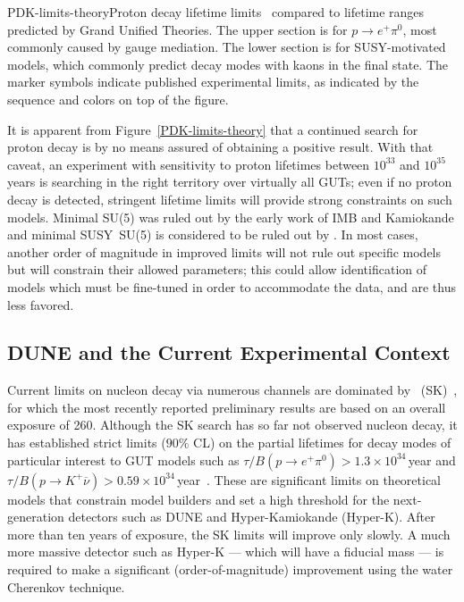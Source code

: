 \begin{cdrfigure}{PDK-limits-theory}{Proton decay lifetime
limits~\cite{Beringer:1900zz,Nishino:2012ipa} compared to lifetime ranges
  predicted by Grand Unified Theories. The upper section is for
  $p \rightarrow e^+ \pi^0$, most commonly caused by gauge mediation.
  The lower section is for SUSY-motivated models, which commonly
  predict decay modes with kaons in the final state. The
  marker symbols indicate published experimental limits, as indicated
  by the sequence and colors on top of the figure.}
\end{cdrfigure}


It is apparent from Figure~\ref{PDK-limits-theory} that a continued
search for proton decay is by no means assured of obtaining a positive
result.  With that caveat, an experiment with sensitivity to proton lifetimes
between $10^{33}$ and $10^{35}$ years is searching in the right territory over
virtually all GUTs; even if no proton decay is detected,
stringent lifetime limits will provide strong constraints on such
models.  Minimal SU(5) was ruled out by the early work of IMB and
Kamiokande and minimal SUSY~SU(5) is considered to be ruled out by \superk.
In most cases, another order of magnitude in improved limits will not rule out
specific models but will constrain their allowed parameters;
this could allow identification of models which must be fine-tuned
in order to accommodate the data, and are thus less favored.

\subsection{DUNE and the Current Experimental Context}

Current limits on nucleon decay via numerous channels are dominated by
\superk\ (SK)~\cite{Raaf:2012pva}, for which the most recently
reported preliminary results are based on an overall exposure of
\SI{260}{\ktyr}.
%
Although the SK search has so far not observed nucleon decay, it
has established strict limits ($90\%$ CL) on the partial lifetimes for
decay modes of particular interest to GUT models such as $\tau/B(p\to
e^+\pi^0) > 1.3\times 10^{\mathrm{34}}\,$year and $\tau/B(p\to
K^+\overline{\nu}) > 0.59\times
10^{\mathrm{34}}\,$year~\cite{kearns_isoups}.  These are significant
limits on theoretical models that constrain model builders and set a
high threshold for the next-generation detectors such as DUNE and
Hyper-Kamiokande (Hyper-K). After more than ten years of exposure, the SK limits
will improve only slowly. A much more massive detector such as
Hyper-K --- which will have a  fiducial mass 
--- is required to make a significant (order-of-magnitude) improvement 
using the water Cherenkov technique.

